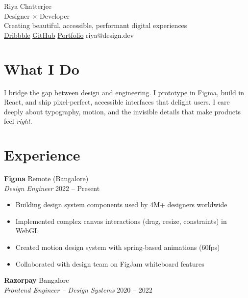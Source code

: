 \documentclass[10pt,letterpaper]{article}
\begin{document}
\vspace{20pt}
\begin{center}
{\Huge\color{designpink} Riya Chatterjee}\\[12pt]
{\large Designer $\times$ Developer}\\[8pt]
{\normalsize Creating beautiful, accessible, performant digital experiences}\\[12pt]
{\small {} \href{https://dribbble.com/riyac}{Dribbble} \quad {} \href{https://github.com/riyac}{GitHub} \quad {} \href{https://riyachatterjee.design}{Portfolio} \quad {} riya@design.dev}
\end{center}

\vspace{16pt}

\section{What I Do}

I bridge the gap between design and engineering. I prototype in Figma, build in React, and ship pixel-perfect, accessible interfaces that delight users. I care deeply about typography, motion, and the invisible details that make products feel \textit{right}.

\section{Experience}

\textbf{Figma} \hfill Remote (Bangalore)\\
{\color{designpink}\textit{Design Engineer}} \hfill 2022 -- Present

\begin{itemize}
\item Building design system components used by 4M+ designers worldwide
\item Implemented complex canvas interactions (drag, resize, constraints) in WebGL
\item Created motion design system with spring-based animations (60fps)
\item Collaborated with design team on FigJam whiteboard features
\end{itemize}

\vspace{12pt}
\textbf{Razorpay} \hfill Bangalore\\
{\color{designpink}\textit{Frontend Engineer -- Design Systems}} \hfill 2020 -- 2022
\end{document}

